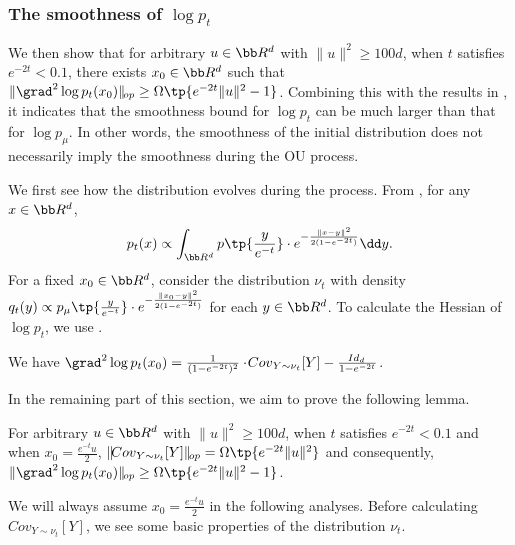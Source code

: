 \subsubsection{The smoothness of $\log p_t$}\label{subsec:stitched2}

We then show that for arbitrary $u\in \bb R^d$ with $\|u\|^2\geq 100d$, when $t$ satisfies $e^{-2t}<0.1$, there exists $x_0\in \bb R^d$ such that $\|\grad^2 \log p_t(x_0)\|_{\!{op}}\geq \Omega\tp{e^{-2t}\|u\|^2-1}$.
Combining this with the results in , it indicates that the smoothness bound for $\log p_t$ can be much larger than that for $\log p_{\mu}$. In other words, the smoothness of the initial distribution does not necessarily imply the smoothness during the OU process. 

We first see how the distribution evolves during the process. From , for any $x\in \bb R^d$,
\[
    p_t(x) \propto \int_{\bb R^d} p\tp{\frac{y}{e^{-t}}} \cdot e^{-\frac{\|x-y\|^2}{2(1-e^{-2t})}} \dd y.
\]
For a fixed $x_0\in \bb R^d$, consider the distribution $\nu_t$ with density $q_t(y)\propto p_{\mu}\tp{\frac{y}{e^{-t}}} \cdot e^{-\frac{\|x_0-y\|^2}{2(1-e^{-2t})}}$ for each $y\in \bb R^d$. To calculate the Hessian of $\log p_t$, we use .
\begin{proposition}\label{prop:stitched-decomp}
    We have $\grad^2 \log p_t(x_0) = \frac{1}{(1-e^{-2t})^2}\cdot \!{Cov}_{Y\sim \nu_t}[Y] - \frac{\!{Id}_d}{1-e^{-2t}}$.
\end{proposition}

In the remaining part of this section, we aim to prove the following lemma.
\begin{theorem}\label{thm:stitched2}
    For arbitrary $u\in \bb R^d$ with $\|u\|^2\geq 100d$, when $t$ satisfies $e^{-2t}<0.1$ and when $x_0=\frac{e^{-t}u}{2}$, $\|\!{Cov}_{Y\sim \nu_t}[Y]\|_{\!{op}} = \Omega\tp{e^{-2t}\|u\|^2}$ and consequently, $\|\grad^2 \log p_t(x_0)\|_{\!{op}}\geq \Omega\tp{e^{-2t}\|u\|^2-1}$.
\end{theorem}

We will always assume $x_0=\frac{e^{-t}u}{2}$ in the following analyses. Before calculating $\!{Cov}_{Y\sim \nu_t}[Y]$, we see some basic properties of the distribution $\nu_t$. 

